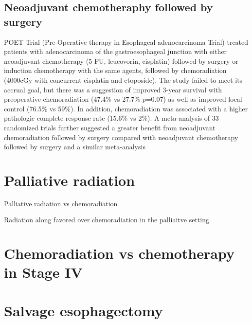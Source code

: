 \documentclass[
]{book}
\begin{document}
\hypertarget{neoadjuvant-chemotheraphy-followed-by-surgery}{%
\subsection{Neoadjuvant chemotheraphy followed by surgery}\label{neoadjuvant-chemotheraphy-followed-by-surgery}}

POET Trial (Pre-Operative therapy in Esophageal adenocarcinoma Trial) treated patients with adenocarcinoma of the gastroesophageal junction with either neoadjuvant chemotherapy (5-FU, leucovorin, cisplatin) followed by surgery or induction chemotherapy with the same agents, followed by chemoradiation (4000cGy with concurrent cisplatin and etoposide). The study failed to meet its accrual goal, but there was a suggestion of improved 3-year survival with preoperative chemoradiation (47.4\% vs 27.7\% \emph{p}=0.07) as well as improved local control (76.5\% vs 59\%). In addition, chemoradiation was associated with a higher pathologic complete response rate (15.6\% vs 2\%)\citep{stahl851}. A meta-analysis of 33 randomized trials further suggested a greater benefit from neoadjuvant chemoradiation followed by surgery compared with neoadjuvant chemotherapy followed by surgery\citep{pasquali481} and a similar meta-analysis \citep{sjoquist681}

\hypertarget{palliative-radiation}{%
\section{Palliative radiation}\label{palliative-radiation}}

Palliative radiation vs chemoradiation \citep{penniment114}

Radiation along favored over chemoradiation in the palliaitve setting \citep{penniment114}

\hypertarget{chemoradiation-vs-chemotherapy-in-stage-iv}{%
\section{Chemoradiation vs chemotherapy in Stage IV}\label{chemoradiation-vs-chemotherapy-in-stage-iv}}

\citep{guttman1134}

\hypertarget{salvage-esophagectomy}{%
\section{Salvage esophagectomy}\label{salvage-esophagectomy}}
\end{document}
